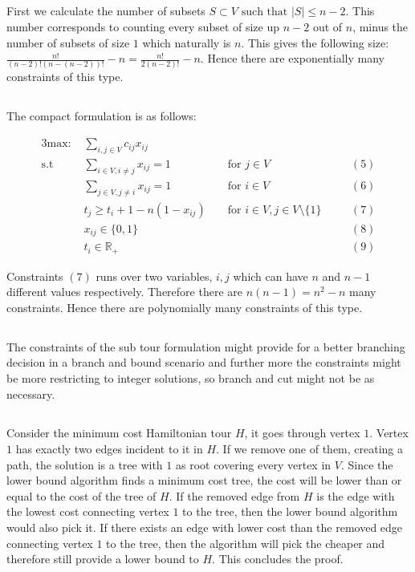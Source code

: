 \subsection{}  %
First we calculate the number of subsets $S \subset V \text{ such that } |S| \leq n - 2$. This number corresponds to counting every subset of size up $n-2$ out of $n$, minus the number of subsets of size $1$ which naturally is $n$. This gives the following size: $\frac{n!}{(n-2)! (n - (n-2))!}-n = \frac{n!}{2 (n-2)!}-n$. Hence there are exponentially many constraints of this type. 


\subsection{} %

The compact formulation is as follows:

\begin{alignat*}{3}
	\text{max: }    & \sum_{i,j \in V} c_{ij} x_{ij}\\
	\text{s.t }     & \sum_{i \in V, i \neq j} x_{ij} = 1  && \text{ for } j \in V && (5)\\
	& \sum_{j \in V, j \neq i} x_{ij} = 1  && \text{ for } i \in V && (6)\\
	& t_j \geq t_i + 1-n(1-x_{ij})  && \text{ for } i \in V, j \in V \setminus \{1\} \quad && (7)\\
	& x_{ij} \in \{0,1\} && && (8)\\
	& t_i \in \mathbb{R}_+ && && (9)
\end{alignat*}

Constraints $(7)$ runs over two variables, $i,j$ which can have $n$ and $n-1$ different values respectively. Therefore there are $n(n-1) = n^2-n$ many constraints. Hence there are polynomially many constraints of this type.

\subsection{} %
The constraints of the sub tour formulation might provide for a better branching decision in a branch and bound scenario and further more the constraints might be more restricting to integer solutions, so branch and cut might not be as necessary.

\subsection{} %
Consider the minimum cost Hamiltonian tour $H$, it goes through vertex $1$. Vertex $1$ has exactly two edges incident to it in $H$. If we remove one of them, creating a path, the solution is a tree with $1$ as root covering every vertex in $V$. Since the lower bound algorithm finds a minimum cost tree, the cost will be lower than or equal to the cost of the tree of $H$. If the removed edge from $H$ is the edge with the lowest cost connecting vertex $1$ to the tree, then the lower bound algorithm would also pick it. If there exists an edge with lower cost than the removed edge connecting vertex $1$ to the tree, then the algorithm will pick the cheaper and therefore still  provide a lower bound to $H$. This concludes the proof.

